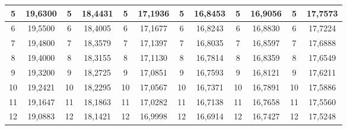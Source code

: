 \documentclass[a4paper,12pt]{article} %
\begin{document}
\begin{longtable}[c]{cccccccccc|c|c|}
	\multicolumn{1}{|c|}{5} & \multicolumn{1}{c|}{19,6300} & \multicolumn{1}{c|}{5} & \multicolumn{1}{c|}{18,4431} & \multicolumn{1}{c|}{5} & \multicolumn{1}{c|}{17,1936} & \multicolumn{1}{c|}{5} & \multicolumn{1}{c|}{16,8453} & \multicolumn{1}{c|}{5} & 16,9056 & 5 & 17,7573 \\ \hline
	\multicolumn{1}{|c|}{6} & \multicolumn{1}{c|}{19,5500} & \multicolumn{1}{c|}{6} & \multicolumn{1}{c|}{18,4005} & \multicolumn{1}{c|}{6} & \multicolumn{1}{c|}{17,1677} & \multicolumn{1}{c|}{6} & \multicolumn{1}{c|}{16,8243} & \multicolumn{1}{c|}{6} & 16,8830 & 6 & 17,7224 \\ \hline
	\multicolumn{1}{|c|}{7} & \multicolumn{1}{c|}{19,4800} & \multicolumn{1}{c|}{7} & \multicolumn{1}{c|}{18,3579} & \multicolumn{1}{c|}{7} & \multicolumn{1}{c|}{17,1397} & \multicolumn{1}{c|}{7} & \multicolumn{1}{c|}{16,8035} & \multicolumn{1}{c|}{7} & 16,8597 & 7 & 17,6888 \\ \hline
	\multicolumn{1}{|c|}{8} & \multicolumn{1}{c|}{19,4000} & \multicolumn{1}{c|}{8} & \multicolumn{1}{c|}{18,3155} & \multicolumn{1}{c|}{8} & \multicolumn{1}{c|}{17,1130} & \multicolumn{1}{c|}{8} & \multicolumn{1}{c|}{16,7814} & \multicolumn{1}{c|}{8} & 16,8359 & 8 & 17,6549 \\ \hline
	\multicolumn{1}{|c|}{9} & \multicolumn{1}{c|}{19,3200} & \multicolumn{1}{c|}{9} & \multicolumn{1}{c|}{18,2725} & \multicolumn{1}{c|}{9} & \multicolumn{1}{c|}{17,0851} & \multicolumn{1}{c|}{9} & \multicolumn{1}{c|}{16,7593} & \multicolumn{1}{c|}{9} & 16,8121 & 9 & 17,6211 \\ \hline
	\multicolumn{1}{|c|}{10} & \multicolumn{1}{c|}{19,2421} & \multicolumn{1}{c|}{10} & \multicolumn{1}{c|}{18,2295} & \multicolumn{1}{c|}{10} & \multicolumn{1}{c|}{17,0567} & \multicolumn{1}{c|}{10} & \multicolumn{1}{c|}{16,7371} & \multicolumn{1}{c|}{10} & 16,7891 & 10 & 17,5886 \\ \hline
	\multicolumn{1}{|c|}{11} & \multicolumn{1}{c|}{19,1647} & \multicolumn{1}{c|}{11} & \multicolumn{1}{c|}{18,1863} & \multicolumn{1}{c|}{11} & \multicolumn{1}{c|}{17,0282} & \multicolumn{1}{c|}{11} & \multicolumn{1}{c|}{16,7138} & \multicolumn{1}{c|}{11} & 16,7658 & 11 & 17,5560 \\ \hline
	\multicolumn{1}{|c|}{12} & \multicolumn{1}{c|}{19,0883} & \multicolumn{1}{c|}{12} & \multicolumn{1}{c|}{18,1421} & \multicolumn{1}{c|}{12} & \multicolumn{1}{c|}{16,9998} & \multicolumn{1}{c|}{12} & \multicolumn{1}{c|}{16,6914} & \multicolumn{1}{c|}{12} & 16,7427 & 12 & 17,5248 \\ \hline

\end{longtable}
\end{document}
